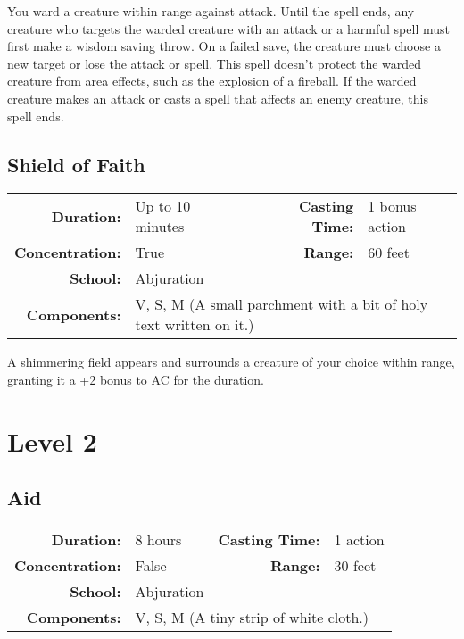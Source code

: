 \documentclass[a5paper, 12pt]{memoir}
\begin{document}
\vspace{1\baselineskip}\noindent You ward a creature within range against attack. Until the spell ends, any creature who targets the warded creature with an attack or a harmful spell must first make a wisdom saving throw. On a failed save, the creature must choose a new target or lose the attack or spell. This spell doesn't protect the warded creature from area effects, such as the explosion of a fireball. If the warded creature makes an attack or casts a spell that affects an enemy creature, this spell ends.

\newpage
\section*{Shield of Faith}

{
\small\centering\vspace{-6pt}
\begin{tabular}{rlrl}
\toprule

\textbf{Duration:} & Up to 10 minutes &
\textbf{Casting Time:} & 1 bonus action \\
\textbf{Concentration:} & True &
\textbf{Range:} & 60 feet \\
\textbf{School:} & Abjuration \\
\textbf{Components:} & \multicolumn{3}{p{0.7\textwidth}}{V, S, M (A small parchment with a bit of holy text written on it.)}\\

\bottomrule
\end{tabular}
}

\vspace{1\baselineskip}\noindent A shimmering field appears and surrounds a creature of your choice within range, granting it a +2 bonus to AC for the duration.

\newpage
\chapter*{Level 2} 
\section*{Aid}

{
\small\centering\vspace{-6pt}
\begin{tabular}{rlrl}
\toprule

\textbf{Duration:} & 8 hours &
\textbf{Casting Time:} & 1 action \\
\textbf{Concentration:} & False &
\textbf{Range:} & 30 feet \\
\textbf{School:} & Abjuration \\
\textbf{Components:} & \multicolumn{3}{p{0.7\textwidth}}{V, S, M (A tiny strip of white cloth.)}\\

\bottomrule
\end{tabular}
}
\end{document}
